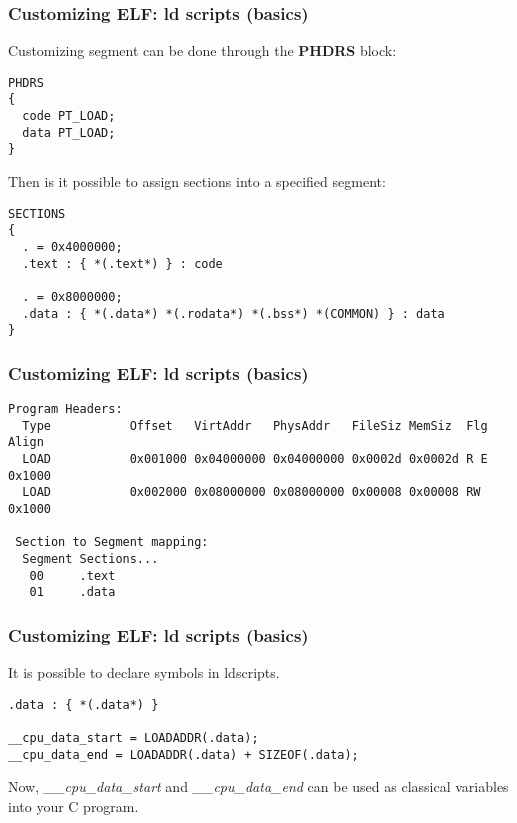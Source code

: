 
\begin{frame}[containsverbatim]
  \frametitle{Customizing ELF: ld scripts (basics)}

  Customizing segment can be done through the \textbf{PHDRS} block:

  \begin{verbatim}
PHDRS
{
  code PT_LOAD;
  data PT_LOAD;
}
  \end{verbatim}

  \-

  Then is it possible to assign sections into a specified segment:

  \begin{verbatim}
SECTIONS
{
  . = 0x4000000;
  .text : { *(.text*) } : code

  . = 0x8000000;
  .data : { *(.data*) *(.rodata*) *(.bss*) *(COMMON) } : data
}
  \end{verbatim}

\end{frame}


\begin{frame}[containsverbatim]
  \frametitle{Customizing ELF: ld scripts (basics)}

  \begin{verbatim}
Program Headers:
  Type           Offset   VirtAddr   PhysAddr   FileSiz MemSiz  Flg Align
  LOAD           0x001000 0x04000000 0x04000000 0x0002d 0x0002d R E 0x1000
  LOAD           0x002000 0x08000000 0x08000000 0x00008 0x00008 RW  0x1000

 Section to Segment mapping:
  Segment Sections...
   00     .text
   01     .data
  \end{verbatim}

\end{frame}


\begin{frame}[containsverbatim]
  \frametitle{Customizing ELF: ld scripts (basics)}

  It is possible to declare symbols in ldscripts.

  \begin{verbatim}
.data : { *(.data*) }

__cpu_data_start = LOADADDR(.data);
__cpu_data_end = LOADADDR(.data) + SIZEOF(.data);
  \end{verbatim}

  Now, \emph{\_\_cpu\_data\_start} and \emph{\_\_cpu\_data\_end} can
  be used as classical variables into your C program.

\end{frame}

